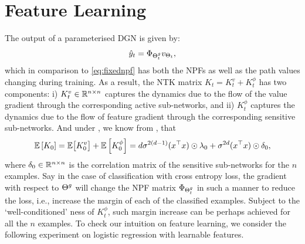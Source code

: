\section{Feature Learning}
The output of a parameterised DGN is given by:
\begin{align}
\hat{y}_t=\Phi_{{\Theta}^g_t}v_{\Theta_t},
\end{align}
which in comparison to \eqref{eq:fixednpf} has both the NPFs as well as the path values changing during training. As a result, the NTK matrix $K_t=K^v_t+K^{\phi}_t$ has two components: i) $K^v_t\in \mathbb{R}^{n\times n}$ captures the dynamics due to the flow of the value gradient through the corresponding active sub-networks, and ii) $K^{\phi}_t$ captures the dynamics due to the flow of feature gradient through the corresponding sensitive sub-networks. And under , we know from , that 
\begin{align*}
\mathbb{E}\left[K_0\right]=\mathbb{E}\big[K^v_0\big]+\mathbb{E}\left[K^{\phi}_0\right]=d\sigma^{2(d-1)} (x^\top x)\odot \lambda_0+\sigma^{2d}  (x^\top x)\odot \delta_0,
\end{align*}
where $\delta_0\in\mathbb{R}^{n\times n}$ is the correlation matrix of the sensitive sub-networks for the $n$ examples. Say in the case of classification with cross entropy loss, the gradient with respect to ${\Theta}^g$ will change the NPF matrix $\Phi_{{\Theta}^g_t}$ in such a manner to reduce the loss, i.e., increase the margin of each of the classified examples. Subject to the `well-conditioned' ness of $K^{\phi}_t$, such margin increase can be perhaps achieved for all the $n$ examples. To check our intuition on feature learning, we consider the following experiment on logistic regression with learnable features.\\

